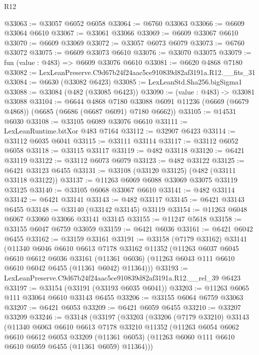 \begin{lexlean}{R12}
\begin{coremodule}
@33063 := @33057 @6052 @6058
@33064 := @6760 @33063
@33066 := @6609 @33064 @6610
@33067 := @33061 @33066
@33069 := @6609 @33067 @6610
@33070 := @6609 @33069
@33072 := @33057 @6073 @6079
@33073 := @6760 @33072
@33075 := @6609 @33073 @6610
@33076 := @33070 @33075
@33079 := fun (value : @483) => @6609 @33076 @6610
@33081 := @6620 @4868 @7180
@33082 := LexLeanPreserve.C9d67b24f24aac5ce910839d82af3191a.R12.__fits_31
@33084 := @6630 (@33082 @6423)
@33085 := LexLeanStd.Sha256.bigSigma1
@33088 := @33084 (@482 (@33085 @6423))
@33090 := (value : @483) -> @33081 @33088
@33104 := @6644
    @4868
    @7180
    @33088
    @6091
    @11236
    (@6669 (@6679 @4868))
    (@6685 (@6686 (@6687 @6091) @7180 @6662))
@33105 := @14531 @6030
@33108 := @33105 @6089 @33076 @6610
@33111 := LexLeanRuntime.bitXor @483 @7164
@33112 := @32907 @6423
@33114 := @33112 @6035 @6041
@33115 := @33111 @33114
@33117 := @33112 @6052 @6058
@33118 := @33115 @33117
@33119 := @482 @33118
@33120 := @6421 @33119
@33122 := @33112 @6073 @6079
@33123 := @482 @33122
@33125 := @6421 @33123 @6455
@33131 := @33108 (@33120 @33125) (@482 (@33111 @33118 @33122))
@33137 := @11263 @6069 @6088 @33069 @33075 @33119 @33125
@33140 := @33105 @6068 @33067 @6610
@33141 := @482 @33114
@33142 := @6421 @33141
@33143 := @482 @33117
@33145 := @6421 @33143 @6455
@33148 := @33140 (@33142 @33145) @33119
@33154 := @11263 @6048 @6067 @33060 @33066 @33141 @33145
@33155 := @11247 @5618
@33158 := @33155 @6047 @6759 @33059
@33159 := @6421 @6036
@33161 := @6421 @6042 @6455
@33162 := @33159 @33161
@33191 := @33158
    (@7179 @33162)
    @33141
    (@11340
      @6046
      @6610
      @6613
      @7178
      @33162
      @11352
      (@11263
        @6037
        @6045
        @6610
        @6612
        @6036
        @33161
        (@11361 @6036)
        (@11263 @6043 @111 @6610 @6610 @6042 @6455 (@11361 @6042) @11364)))
@33193 := LexLeanPreserve.C9d67b24f24aac5ce910839d82af3191a.R12.__rel_39 @6423
@33197 := @33154 (@33191 (@33193 @6035 @6041))
@33203 := @11263 @6065 @111 @33064 @6610 @33143 @6455
@33206 := @33155 @6064 @6759 @33063
@33207 := @6421 @6053
@33209 := @6421 @6059 @6455
@33210 := @33207 @33209
@33246 := @33148
    (@33197
      (@33203
        (@33206
          (@7179 @33210)
          @33143
          (@11340
            @6063
            @6610
            @6613
            @7178
            @33210
            @11352
            (@11263
              @6054
              @6062
              @6610
              @6612
              @6053
              @33209
              (@11361 @6053)
              (@11263 @6060 @111 @6610 @6610 @6059 @6455 (@11361 @6059) @11364)))

\end{coremodule}
\end{lexlean}
